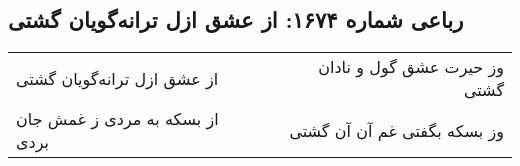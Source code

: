 \begin{center}
\section*{رباعی شماره ۱۶۷۴: از عشق ازل ترانه‌گویان گشتی}
\label{sec:1674}
\begin{longtable}{l p{0.5cm} r}
از عشق ازل ترانه‌گویان گشتی
&&
وز حیرت عشق گول و نادان گشتی
\\
از بسکه به مردی ز غمش جان بردی
&&
وز بسکه بگفتی غم آن آن گشتی
\\
\end{longtable}
\end{center}
